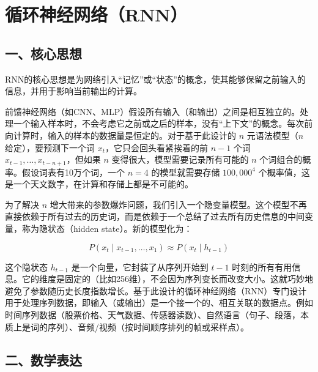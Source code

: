 \setcounter{section}{1}

\hypertarget{ux5faaux73afux795eux7ecfux7f51ux7edcrnn}{%
\section{循环神经网络（RNN）}\label{ux5faaux73afux795eux7ecfux7f51ux7edcrnn}}

\hypertarget{ux4e00ux6838ux5fc3ux601dux60f3-1}{%
\subsection{一、核心思想}\label{ux4e00ux6838ux5fc3ux601dux60f3-1}}

RNN的核心思想是为网络引入``记忆''或``状态''的概念，使其能够保留之前输入的信息，并用于影响当前输出的计算。

前馈神经网络（如CNN、MLP）假设所有输入（和输出）之间是相互独立的。处理一个输入样本时，不会考虑它之前或之后的样本，没有``上下文''的概念。每次前向计算时，输入的样本的数据量是恒定的。对于基于此设计的 \(n\) 元语法模型（\(n\) 给定），要预测下一个词 \(x_t\)，它只会回头看紧挨着的前 \(n-1\) 个词 \(x_{t-1},\ldots,x_{t-n+1}\)，但如果 \(n\) 变得很大，模型需要记录所有可能的 \(n\) 个词组合的概率。假设词表有10万个词，一个 \(n=4\) 的模型就需要存储 \(100{,}000^4\) 个概率值，这是一个天文数字，在计算和存储上都是不可能的。

为了解决 \(n\) 增大带来的参数爆炸问题，我们引入一个隐变量模型。这个模型不再直接依赖于所有过去的历史词，而是依赖于一个总结了过去所有历史信息的中间变量，称为隐状态（hidden state）。新的模型化为：

\[
P(x_t \mid x_{t-1},\ldots,x_1) \approx P(x_t \mid h_{t-1})
\]

这个隐状态 \(h_{t-1}\) 是一个向量，它封装了从序列开始到 \(t-1\) 时刻的所有有用信息。它的维度是固定的（比如256维），不会因为序列变长而改变大小。这就巧妙地避免了参数随历史长度指数增长。基于此设计的循环神经网络（RNN）专门设计用于处理序列数据，即输入（或输出）是一个接一个的、相互关联的数据点。例如时间序列数据（股票价格、天气数据、传感器读数）、自然语言（句子、段落，本质上是词的序列）、音频/视频（按时间顺序排列的帧或采样点）。

\hypertarget{ux4e8cux6570ux5b66ux8868ux8fbe}{%
\subsection{二、数学表达}\label{ux4e8cux6570ux5b66ux8868ux8fbe}}

